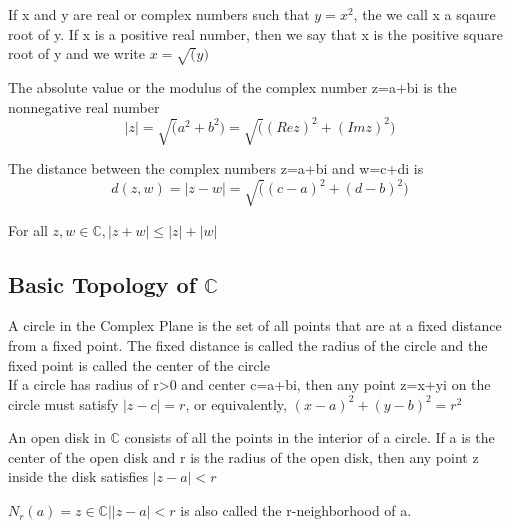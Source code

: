 \documentclass{article}
\begin{document}
\begin{definition}
    If x and y are real or complex numbers such that $y=x^2$, the we call x a
    sqaure root of y. If x is a positive real number, then we say that x is the
    positive square root of y and we write $x=\sqrt(y)$
\end{definition}

\begin{definition}
    The absolute value or the modulus of the complex number z=a+bi is the nonnegative
    real number $$ |z | = \sqrt(a^2 + b^2) = \sqrt((Re z)^2 + (Im z)^2) $$
\end{definition}

\begin{definition}
    The distance between the complex numbers z=a+bi and w=c+di is
    $$ d(z,w) = |z-w| = \sqrt((c-a)^2 + (d-b)^2)$$
\end{definition}

\begin{theorem}
    For all $z,w \in \mathbb{C}, |z+w| \leq |z| + |w| $
\end{theorem}

\subsection{Basic Topology of $\mathbb{C}$}

\begin{definition}[Circle]
    A circle in the Complex Plane is the set of all points that are at a fixed
    distance from a fixed point. The fixed distance is called the radius of the
    circle and the fixed point is called the center of the circle\\

    If a circle has radius of r>0 and center c=a+bi, then any point z=x+yi on the
    circle must satisfy $|z-c| = r$, or equivalently, $(x-a)^2 + (y-b)^2 = r^2$
\end{definition}

\begin{definition}
    An open disk in $\mathbb{C}$ consists of all the points in the interior of a
    circle. If a is the center of the open disk and r is the radius of the open
    disk, then any point z inside the disk satisfies $|z-a|<r$
\end{definition}

\begin{definition}[r-neighborhood of a]
    $ N_r(a) = {z \in \mathbb{C} | |z-a| < r} $ is also called the r-neighborhood of a.
\end{definition}
\end{document}
